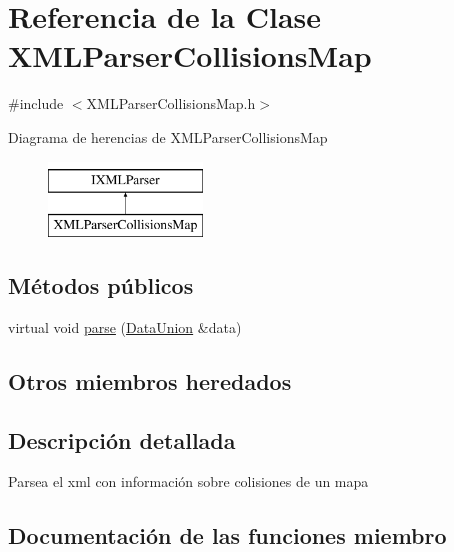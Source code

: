 \hypertarget{classXMLParserCollisionsMap}{}\section{Referencia de la Clase X\+M\+L\+Parser\+Collisions\+Map}
\label{classXMLParserCollisionsMap}


{\ttfamily \#include $<$X\+M\+L\+Parser\+Collisions\+Map.\+h$>$}

Diagrama de herencias de X\+M\+L\+Parser\+Collisions\+Map\begin{figure}[H]
\begin{center}
\leavevmode
\includegraphics[height=2.000000cm]{classXMLParserCollisionsMap}
\end{center}
\end{figure}
\subsection*{Métodos públicos}
\begin{DoxyCompactItemize}
\item 
virtual void \hyperlink{classXMLParserCollisionsMap_a2cd272aef88a40c0f649d13b7821e118}{parse} (\hyperlink{unionDataUnion}{Data\+Union} \&data)
\end{DoxyCompactItemize}
\subsection*{Otros miembros heredados}


\subsection{Descripción detallada}
Parsea el xml con información sobre colisiones de un mapa 

\subsection{Documentación de las funciones miembro}
\hypertarget{classXMLParserCollisionsMap_a2cd272aef88a40c0f649d13b7821e118}{}
